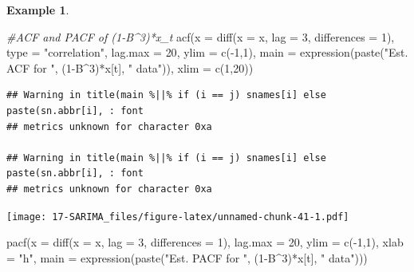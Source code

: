\documentclass[
]{book}
\newenvironment{Shaded}{\begin{snugshade}}{\end{snugshade}}
\newcommand{\AttributeTok}[1]{\textcolor[rgb]{0.77,0.63,0.00}{#1}}
\newcommand{\CommentTok}[1]{\textcolor[rgb]{0.56,0.35,0.01}{\textit{#1}}}
\newcommand{\DecValTok}[1]{\textcolor[rgb]{0.00,0.00,0.81}{#1}}
\newcommand{\FunctionTok}[1]{\textcolor[rgb]{0.00,0.00,0.00}{#1}}
\newcommand{\NormalTok}[1]{#1}
\newcommand{\OtherTok}[1]{\textcolor[rgb]{0.56,0.35,0.01}{#1}}
\newcommand{\SpecialCharTok}[1]{\textcolor[rgb]{0.00,0.00,0.00}{#1}}
\newcommand{\StringTok}[1]{\textcolor[rgb]{0.31,0.60,0.02}{#1}}
\theoremstyle{definition}
\theoremstyle{definition}
\newtheorem{example}{Example}[chapter]
\theoremstyle{definition}
\theoremstyle{definition}
\theoremstyle{remark}
\begin{document}
\begin{example}
\begin{Shaded}
\begin{Highlighting}[]
\CommentTok{\#ACF and PACF of (1{-}B\^{}3)*x\_t}
\FunctionTok{acf}\NormalTok{(}\AttributeTok{x =} \FunctionTok{diff}\NormalTok{(}\AttributeTok{x =}\NormalTok{ x, }\AttributeTok{lag =} \DecValTok{3}\NormalTok{, }\AttributeTok{differences =} \DecValTok{1}\NormalTok{), }\AttributeTok{type =} 
    \StringTok{"correlation"}\NormalTok{, }\AttributeTok{lag.max =} \DecValTok{20}\NormalTok{, }\AttributeTok{ylim =} \FunctionTok{c}\NormalTok{(}\SpecialCharTok{{-}}\DecValTok{1}\NormalTok{,}\DecValTok{1}\NormalTok{), }\AttributeTok{main =} 
    \FunctionTok{expression}\NormalTok{(}\FunctionTok{paste}\NormalTok{(}\StringTok{"Est. ACF for "}\NormalTok{, (}\DecValTok{1}\SpecialCharTok{{-}}\NormalTok{B}\SpecialCharTok{\^{}}\DecValTok{3}\NormalTok{)}\SpecialCharTok{*}\NormalTok{x[t], }\StringTok{" }
\StringTok{    data"}\NormalTok{)), }\AttributeTok{xlim =} \FunctionTok{c}\NormalTok{(}\DecValTok{1}\NormalTok{,}\DecValTok{20}\NormalTok{))}
\end{Highlighting}
\end{Shaded}

\begin{verbatim}
## Warning in title(main %||% if (i == j) snames[i] else paste(sn.abbr[i], : font
## metrics unknown for character 0xa

## Warning in title(main %||% if (i == j) snames[i] else paste(sn.abbr[i], : font
## metrics unknown for character 0xa
\end{verbatim}

\texttt{[image: 17-SARIMA\_files/figure-latex/unnamed-chunk-41-1.pdf]}

\begin{Shaded}
\begin{Highlighting}[]
\FunctionTok{pacf}\NormalTok{(}\AttributeTok{x =} \FunctionTok{diff}\NormalTok{(}\AttributeTok{x =}\NormalTok{ x, }\AttributeTok{lag =} \DecValTok{3}\NormalTok{, }\AttributeTok{differences =} \DecValTok{1}\NormalTok{), lag.max }
    \OtherTok{=} \DecValTok{20}\NormalTok{, }\AttributeTok{ylim =} \FunctionTok{c}\NormalTok{(}\SpecialCharTok{{-}}\DecValTok{1}\NormalTok{,}\DecValTok{1}\NormalTok{), }\AttributeTok{xlab =} \StringTok{"h"}\NormalTok{, }\AttributeTok{main =}
    \FunctionTok{expression}\NormalTok{(}\FunctionTok{paste}\NormalTok{(}\StringTok{"Est. PACF for "}\NormalTok{, (}\DecValTok{1}\SpecialCharTok{{-}}\NormalTok{B}\SpecialCharTok{\^{}}\DecValTok{3}\NormalTok{)}\SpecialCharTok{*}\NormalTok{x[t],  }
    \StringTok{" data"}\NormalTok{)))}
\end{Highlighting}
\end{Shaded}


\end{example}
\end{document}
